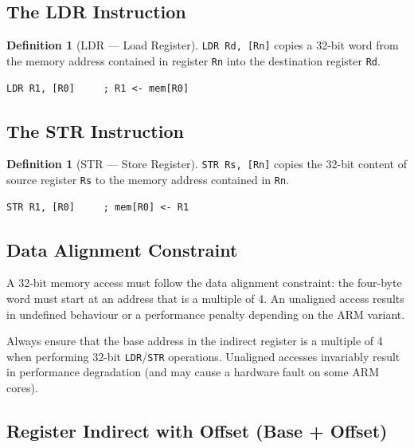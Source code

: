 \documentclass[11pt, a4paper, notitlepage]{report}
\theoremstyle{definition}
\newtheorem{definition}[theorem]{Definition}
\theoremstyle{remark}
\theoremstyle{definition}
\begin{document}
\subsection{The LDR Instruction}

\begin{definition}[LDR --- Load Register]
\label{def:ldr-ch4}
\texttt{LDR Rd, [Rn]} copies a 32-bit word from the memory address contained in register \texttt{Rn} into the destination register \texttt{Rd}.
\end{definition}

\begin{lstlisting}
LDR R1, [R0]     ; R1 <- mem[R0]
\end{lstlisting}

\subsection{The STR Instruction}

\begin{definition}[STR --- Store Register]
\label{def:str}
\texttt{STR Rs, [Rn]} copies the 32-bit content of source register \texttt{Rs} to the memory address contained in \texttt{Rn}.
\end{definition}

\begin{lstlisting}
STR R1, [R0]     ; mem[R0] <- R1
\end{lstlisting}

\subsection{Data Alignment Constraint}

A 32-bit memory access must follow the data alignment constraint: the four-byte word must start at an address that is a multiple of 4. An unaligned access results in undefined behaviour or a performance penalty depending on the ARM variant.

\begin{warning}[title={Unaligned Memory Access}]
Always ensure that the base address in the indirect register is a multiple of 4 when performing 32-bit \texttt{LDR}/\texttt{STR} operations. Unaligned accesses invariably result in performance degradation (and may cause a hardware fault on some ARM cores).
\end{warning}

\subsection{Register Indirect with Offset (Base + Offset)}
\end{document}
